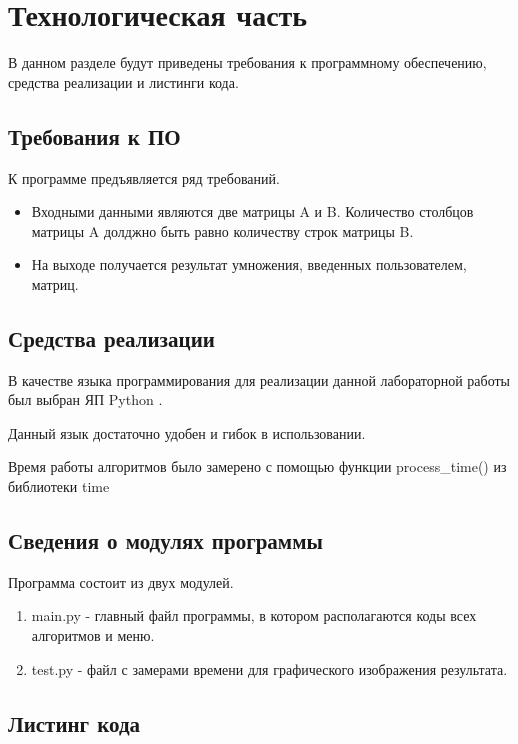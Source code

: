 \chapter{Технологическая часть}

В данном разделе будут приведены требования к программному обеспечению, средства реализации и листинги кода.

\section{Требования к ПО}

К программе предъявляется ряд требований.
\begin{itemize}
	\item Входными данными являются две матрицы A и B. Количество столбцов матрицы A долджно быть равно количеству строк матрицы B.
	\item На выходе получается результат умножения, введенных пользователем, матриц.

\end{itemize}


\section{Средства реализации}

В качестве языка программирования для реализации данной лабораторной работы был выбран ЯП Python \cite{pythonlang}. 

Данный язык достаточно удобен и гибок в использовании. 

Время работы алгоритмов было замерено с помощью функции process\_time() из библиотеки time \cite{pythonlangtime}

\section{Сведения о модулях программы}
Программа состоит из двух модулей.
\begin{enumerate}
	\item main.py - главный файл программы, в котором располагаются коды всех алгоритмов и меню.
	\item test.py - файл с замерами времени для графического изображения результата.
\end{enumerate}


\section{Листинг кода}

